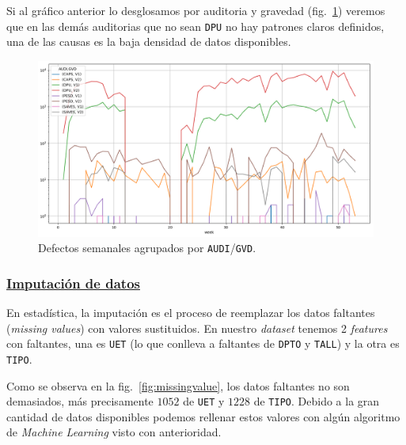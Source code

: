 \documentclass[a4paper,12pt]{article}
\begin{document}
		\clearpage
				
		Si al gráfico anterior lo desglosamos por auditoria y gravedad (fig.~\ref{fig:defectsperaudigvdweek}) veremos que en las demás auditorias que no sean \texttt{DPU} no hay patrones claros definidos, una de las causas es la baja densidad de datos disponibles.
				
		\begin{figure}[H]
			\begin{center}
				\includegraphics[width=1\textwidth]{audigvd.png}
				\caption{Defectos semanales agrupados por \texttt{AUDI}/\texttt{GVD}.}
				\label{fig:defectsperaudigvdweek}
			\end{center}
		\end{figure}
				
		\clearpage
				
		\subsubsection{\href{https://github.com/GeraCollante/tesis-icomp-machinelearning/blob/main/DataImputation.ipynb}{\color{blue}Imputación de datos}}\label{DataImputation}
				 
		En estadística, la imputación es el proceso de reemplazar los datos faltantes (\textit{missing values}) con valores sustituidos. En nuestro \textit{dataset} tenemos 2 \textit{features} con faltantes, una es \texttt{UET} (lo que conlleva a faltantes de \texttt{DPTO} y \texttt{TALL}) y la otra es \texttt{TIPO}.
				
		Como se observa en la fig.~\ref{fig:missingvalue}, los datos faltantes no son demasiados, más precisamente $1052$ de \texttt{UET} y $1228$ de \texttt{TIPO}. Debido a la gran cantidad de datos disponibles podemos rellenar estos valores con algún algoritmo de \textit{Machine Learning} visto con anterioridad.
				
\end{document}
